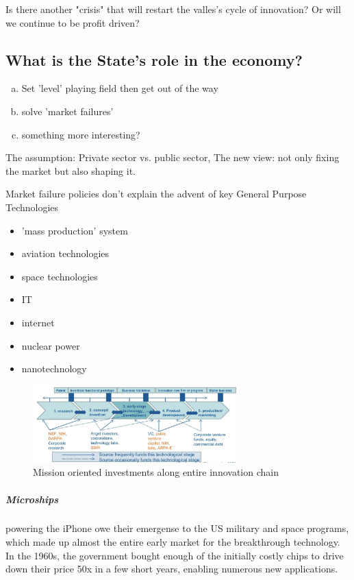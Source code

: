 Is there another "crisis" that will restart the valles's cycle of innovation?
Or will we continue to be profit driven?


\subsection{What is the State's role in the economy?}

\begin{enumerate}[a)]
    \item Set 'level' playing field then get out of the way
    \item solve 'market failures'
    \item something more interesting?
\end{enumerate}

The assumption: Private sector vs. public sector,
The new view: not only fixing the market but also shaping it.

Market failure policies don't explain the advent of key General Purpose
Technologies
\begin{itemize}
    \item 'mass production' system
    \item aviation technologies
    \item space technologies
    \item IT
    \item internet
    \item nuclear power
    \item nanotechnology
\end{itemize}

\begin{figure}[h]
    \centering
    \includegraphics[width=0.7\textwidth]{Pictures/Mission_oriented_investment.png}
    \caption{Mission oriented investments along entire innovation chain}
\end{figure}

\subparagraph{Microships} powering the iPhone owe their emergense to the US
military and space programs, which made up almost the entire early market for
the breakthrough technology. In the 1960s, the government bought enough of the
initially costly chips to drive down their price 50x in a few short years,
enabling numerous new applications.

